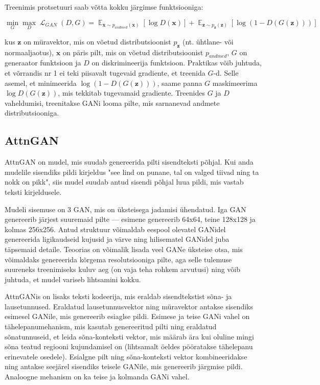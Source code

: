 \documentclass{vilgym}
\DeclareMathOperator{\EX}{\mathbb{E}}
\DeclareMathOperator{\loss}{\mathcal{L}}
\begin{document}
	Treenimis protsetuuri saab võtta kokku järgimse funktsiooniga:

	\begin{equation}
		\operatorname*{min}_G \operatorname*{max}_D \loss_{GAN}(D,G) = \EX_{\boldsymbol{x}\sim p_{andmed}(\boldsymbol{x})}[\log D(\boldsymbol{x})] + \EX_{\boldsymbol{z}\sim p_{\boldsymbol{z}}(\boldsymbol{z})}[\log(1-D(G(\boldsymbol{z})))]
	\end{equation}

	kus $ \boldsymbol{z} $ on müravektor, mis on võetud distributsioonist $ p_{\boldsymbol{z}} $ (nt. ühtlane- või normaaljaotus), $ \boldsymbol{x} $ on päris pilt, mis on võetud distributsioonist $ p_{andmed} $, $ G $ on generaator funktsioon ja $ D $ on diskrimineerija funktsioon. Praktikas võib juhtuda, et võrrandis nr 1 ei teki piisavalt tugevaid gradiente, et treenida $ G $-d. Selle asemel, et minimeerida $ \log (1 - D(G(\boldsymbol{z}))) $, saame panna $ G $ maskimeerima $ \log D(G(\boldsymbol{z})) $, mis tekkitab tugevamaid gradiente. Treenides $ G $ ja $ D $ vaheldumisi, treenitakse GANi looma pilte, mis sarnanevad andmete distributsiooniga. \parencite{gan}

	
	\subsection{AttnGAN}

	AttnGAN on mudel, mis suudab genereerida pilti sisendteksti põhjal. Kui anda mudelile sisendiks pildi kirjeldus "see lind on punane, tal on valged tiivad ning ta nokk on pikk", siis mudel suudab antud sisendi põhjal luua pildi, mis vastab teksti kirjeldusele.
	
	Mudeli sisemuse on 3 GAN, mis on üksteisega jadamisi ühendatud. Iga GAN genereerib järjest suuremaid pilte --- esimene genereerib 64x64, teine 128x128 ja kolmas 256x256. Antud struktuur võimaldab eespool olevatel GANidel genereerida ligikaudseid kujusid ja värve ning hilisematel GANidel juba täpsemaid detaile. Teoorias on võimalik lisada veel GANe üksteise otsa, mis võimaldaks genereerida kõrgema resolutsiooniga pilte, aga selle tulemuse suureneks treenimiseks kuluv aeg (on vaja teha rohkem arvutusi) ning võib juhtuda, et mudel variseb lihtsamini kokku.

	AttnGANis on lisaks teksti kodeerija, mis eraldab sisendtekstist sõna- ja lausetunnused. Eraldatud lausetunnusvektor ning müravektor antakse sisendiks esimesel GANile, mis genereerib esiaglse pildi. Esimese ja teise GANi vahel on tähelepanumehanism, mis kasutab genereeritud pilti ning eraldatud sõnatunnuseid, et leida sõna-konteksti vektor, mis määrab ära kui oluline mingi sõna teatud regiooni kujundamisel on (lihtsamalt öeldes pööratakse tähelepanu erinevatele osedele). Esialgne pilt ning sõna-konteksti vektor kombineeridakse ning antakse seejärel sisendiks teisele GANile, mis genereerib järgmise pildi. Analoogne mehanism on ka teise ja kolmanda GANi vahel.
\end{document}

